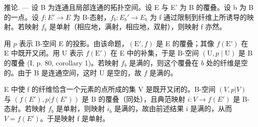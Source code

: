 推论. --- 设 B 为连通且局部连通的拓扑空间。设 E 与 E' 为 B 的覆叠。设 b 为 B 的一点。设 \(f: E' \to E\) 为 B-态射，\(f_{b}: E_{b}' \to E_{b}\) 为 f 通过限制到纤维上所诱导的映射。若映射 \(f_{b}\) 是单射（相应地，满射，相应地，双射），则映射 f 亦然。

用 \(p\) 表示 B-空间 E 的投影。由该命题，\((\mathrm{E}', f)\) 是 E 的覆叠；其像 \(f(\mathrm{E}')\) 在 E 中既开又闭。用 U 表示 \(f(\mathrm{E}')\) 在 E 中的补集，于是 B-空间 \((\mathrm{U}, p \mid \mathrm{U})\) 是 B 的覆叠 (I, p. 80, corollary 1)。若映射 \(f_b\) 是满的，则这个覆叠在 \(b\) 处的纤维是空的。由于 B 是连通空间，这时 U 是空的，故 \(f\) 是满的。

E 中使 f 的纤维恰含一个元素的点所成的集 V 是既开又闭的。B-空间 \((V, p|V)\) 与 \((f(E'), p|f(E'))\) 是 B 的覆叠（同处），且典范映射 \(i: V \to f(E')\) 是 B-态射。若映射 \(f_b\) 是单射，则映射 \(i_b\) 是满的，故由前述结果 i 是满的，从而 \(V = f(E')\)。于是映射 f 是单射。

